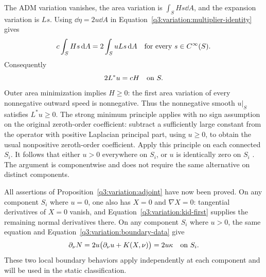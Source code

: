 The ADM variation vanishes, the area variation is
$\int_SHs\dd A$, and the expansion variation is $Ls$.
Using $\dd\eta=2u\dd A$ in
Equation~\eqref{q3:variation:multiplier-identity} gives
\[
 c\int_S Hs\,\mathrm d A=2\int_S uLs\,\mathrm d A
 \quad\hbox{for every }s\in C^\infty(S).
\]
Consequently
\begin{equation}
 2L^*u=cH\quad\hbox{on }S.
 \label{q3:variation:boundary-stability}
\end{equation}
Outer area minimization implies $H\ge0$: the first area variation
of every nonnegative outward speed is nonnegative.  Thus the
nonnegative smooth $u|_S$ satisfies $L^*u\ge0$.  The strong minimum
principle applies with no sign assumption on the original
zeroth-order coefficient: subtract a sufficiently large constant
from the operator with positive Laplacian principal part, using
$u\ge0$, to obtain the usual nonpositive zeroth-order coefficient.
Apply this principle on each connected $S_i$.  It follows that
either $u>0$ everywhere on $S_i$, or $u$ is identically zero on $S_i$
\cite[Chapter 3]{GilbargTrudinger2001}.  The argument is componentwise
and does not require the same alternative on distinct components.

All assertions of Proposition~\ref{q3:variation:adjoint} have now been
proved.  On any component $S_i$ where $u=0$, one also has
$X=0$ and $\nabla X=0$: tangential derivatives of $X=0$ vanish,
and Equation~\eqref{q3:variation:kid-first} supplies the remaining
normal derivatives there.  On any component $S_i$ where $u>0$,
the same equation and Equation~\eqref{q3:variation:boundary-data} give
\[
 \partial_\nu N
   =2u\bigl(\partial_\nu u+K(X,\nu)\bigr)=2u\kappa
   \quad\hbox{on }S_i.
\]
These two local boundary behaviors apply independently at each component
and will be used in the static classification.
